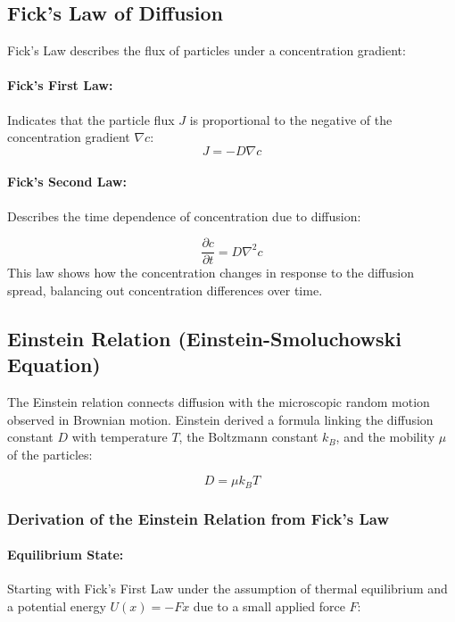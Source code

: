 \documentclass[12pt,english]{scrartcl}
\begin{document}
\subsection{Fick's Law of Diffusion}

Fick's Law describes the flux of particles under a concentration gradient:

\paragraph{Fick's First Law:} Indicates that the particle flux $J$ is proportional to the negative of the
concentration gradient $\nabla c$:
\begin{equation}
	J = -D \nabla c
	\label{eq:ficks_first_law}
\end{equation}
\paragraph{Fick's Second Law:} Describes the time dependence of concentration due to diffusion:

\begin{equation}
	\frac{\partial c}{\partial t} = D \nabla^2 c
	\label{eq:ficks_second_law}
\end{equation}
This law shows how the concentration changes in response to
the diffusion spread, balancing out concentration differences over time.\cite{fickUeberDiffusion1855}

\subsection{Einstein Relation (Einstein-Smoluchowski Equation)}

The Einstein relation connects diffusion with the microscopic random motion
observed in Brownian motion. Einstein derived a formula linking the diffusion
constant $D$ with temperature $T$, the Boltzmann constant $k_B$, and the
mobility $\mu$ of the particles:

\begin{equation}
	D = \mu k_B T
	\label{eq:einstein_relation}
\end{equation}

\subsubsection{Derivation of the Einstein Relation from Fick's Law}

\paragraph{Equilibrium State:} Starting with Fick's First Law under the assumption of thermal equilibrium and
a potential energy $U(x)=−Fx$ due to a small applied force $F$:
\end{document}
